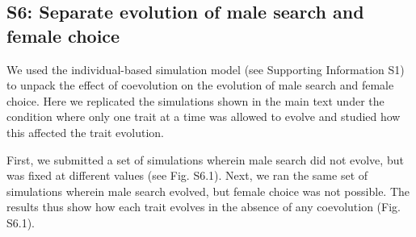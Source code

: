 \documentclass[
]{article}
\begin{document}
\clearpage

\hypertarget{s6-separate-evolution-of-male-search-and-female-choice}{%
\subsection{S6: Separate evolution of male search and female
choice}\label{s6-separate-evolution-of-male-search-and-female-choice}}

We used the individual-based simulation model (see Supporting
Information S1) to unpack the effect of coevolution on the evolution of
male search and female choice. Here we replicated the simulations shown
in the main text under the condition where only one trait at a time was
allowed to evolve and studied how this affected the trait evolution.

First, we submitted a set of simulations wherein male search did not
evolve, but was fixed at different values (see Fig. S6.1). Next, we ran
the same set of simulations wherein male search evolved, but female
choice was not possible. The results thus show how each trait evolves in
the absence of any coevolution (Fig. S6.1).

\captionsetup{labelformat=empty}
\end{document}
